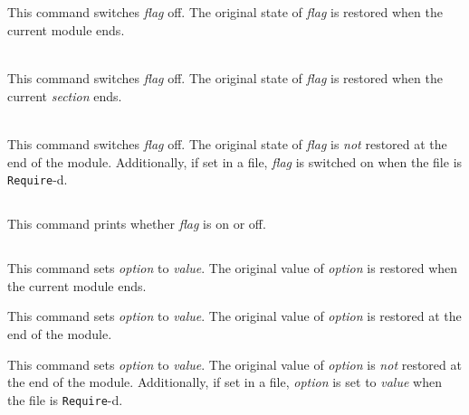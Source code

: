\subsection[\tt Unset {\rm\sl flag}.]{}
This command switches {\rm\sl flag} off. The original state of {\rm\sl flag}
is restored when the current module ends.

\begin{Variants}
\item {}\\
This command switches {\rm\sl flag} off. The original state of {\rm\sl flag}
is restored when the current \emph{section} ends.
\item {}\\
This command switches {\rm\sl flag} off.  The original state of
{\rm\sl flag} is \emph{not} restored at the end of the module. Additionally,
if set in a file, {\rm\sl flag} is switched on when the file is
{\tt Require}-d.
\end{Variants}

\subsection[\tt Test {\rm\sl flag}.]{}
This command prints whether {\rm\sl flag} is on or off.

\subsection[\tt Set {\rm\sl option} {\rm\sl value}.]{}
This command sets {\rm\sl option} to {\rm\sl value}. The original value of
{\rm\sl option} is restored when the current module ends.

\begin{Variants}
\item {}
This command sets {\rm\sl option} to {\rm\sl value}. The original value of
{\rm\sl option} is restored at the end of the module.
\item {}
This command sets {\rm\sl option} to {\rm\sl value}. The original value of
{\rm\sl option} is \emph{not} restored at the end of the module. Additionally,
if set in a file, {\rm\sl option} is set to {\rm\sl value} when the file is
{\tt Require}-d.
\end{Variants}

